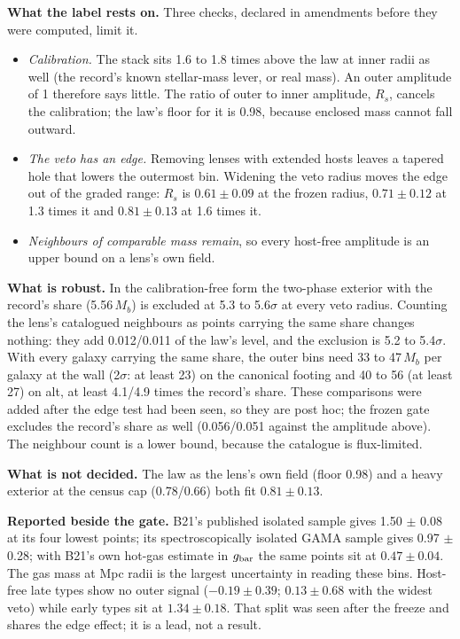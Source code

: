 \documentclass[10pt]{article}
\begin{document}
\textbf{What the label rests on.} Three checks, declared in amendments before they were computed, limit it.
\begin{itemize}
\item \emph{Calibration.} The stack sits 1.6 to 1.8 times above the law at inner radii as well (the record's known stellar-mass lever, or real mass). An outer amplitude of 1 therefore says little. The ratio of outer to inner amplitude, $R_s$, cancels the calibration; the law's floor for it is 0.98, because enclosed mass cannot fall outward.
\item \emph{The veto has an edge.} Removing lenses with extended hosts leaves a tapered hole that lowers the outermost bin. Widening the veto radius moves the edge out of the graded range: $R_s$ is $0.61\pm0.09$ at the frozen radius, $0.71\pm0.12$ at 1.3 times it and $0.81\pm0.13$ at 1.6 times it.
\item \emph{Neighbours of comparable mass remain}, so every host-free amplitude is an upper bound on a lens's own field.
\end{itemize}

\textbf{What is robust.} In the calibration-free form the two-phase exterior with the record's share (5.56\,$M_b$) is excluded at 5.3 to 5.6$\sigma$ at every veto radius. Counting the lens's catalogued neighbours as points carrying the same share changes nothing: they add 0.012/0.011 of the law's level, and the exclusion is 5.2 to 5.4$\sigma$. With every galaxy carrying the same share, the outer bins need 33 to 47\,$M_b$ per galaxy at the wall (2$\sigma$: at least 23) on the canonical footing and 40 to 56 (at least 27) on alt, at least 4.1/4.9 times the record's share. These comparisons were added after the edge test had been seen, so they are post hoc; the frozen gate excludes the record's share as well (0.056/0.051 against the amplitude above). The neighbour count is a lower bound, because the catalogue is flux-limited.

\textbf{What is not decided.} The law as the lens's own field (floor 0.98) and a heavy exterior at the census cap (0.78/0.66) both fit $0.81\pm0.13$.

\textbf{Reported beside the gate.} B21's published isolated sample gives 1.50 $\pm$ 0.08 at its four lowest points; its spectroscopically isolated GAMA sample gives 0.97 $\pm$ 0.28; with B21's own hot-gas estimate in $g_{\rm bar}$ the same points sit at $0.47\pm0.04$. The gas mass at Mpc radii is the largest uncertainty in reading these bins. Host-free late types show no outer signal ($-0.19\pm0.39$; $0.13\pm0.68$ with the widest veto) while early types sit at $1.34\pm0.18$. That split was seen after the freeze and shares the edge effect; it is a lead, not a result.
\end{document}
